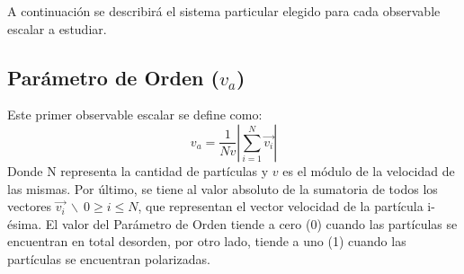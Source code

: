 \documentclass[11pt]{article}
\begin{document}
        A continuación se describirá el sistema particular elegido para cada observable escalar a estudiar.

        \subsection{Parámetro de Orden ($v_a$)}
            Este primer observable escalar se define como:
            \begin{equation}
                v_a = \frac{1}{Nv} \left|\sum_{i=1}^{N} \vec{v_i} \right|
            \end{equation}
            Donde N representa la cantidad de partículas y $v$ es el módulo de la velocidad de las mismas. Por último,
            se tiene al valor absoluto de la sumatoria de todos los vectores $\vec{v_i} \  \backslash \  0 \geq i \leq N$,
            que representan el vector velocidad de la partícula i-ésima. El valor del Parámetro de Orden tiende a cero
            (0) cuando las partículas se encuentran en total desorden, por otro lado, tiende a uno (1) cuando las partículas
            se encuentran polarizadas.
\end{document}
